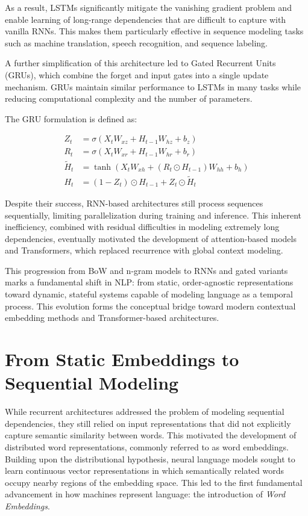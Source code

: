 As a result, LSTMs significantly mitigate the vanishing gradient problem and enable learning of long-range dependencies that are difficult to capture with vanilla RNNs. This makes them particularly effective in sequence modeling tasks such as machine translation, speech recognition, and sequence labeling.

A further simplification of this architecture led to Gated Recurrent Units (GRUs), which combine the forget and input gates into a single update mechanism. GRUs maintain similar performance to LSTMs in many tasks while reducing computational complexity and the number of parameters.

The GRU formulation is defined as:

\begin{align*}
Z_t &= \sigma(X_t W_{xz} + H_{t-1} W_{hz} + b_z) \\
R_t &= \sigma(X_t W_{xr} + H_{t-1} W_{hr} + b_r) \\
\tilde{H}_t &= \tanh(X_t W_{xh} + (R_t \odot H_{t-1}) W_{hh} + b_h) \\
H_t &= (1 - Z_t) \odot H_{t-1} + Z_t \odot \tilde{H}_t
\end{align*}


Despite their success, RNN-based architectures still process sequences sequentially, limiting parallelization during training and inference. This inherent inefficiency, combined with residual difficulties in modeling extremely long dependencies, eventually motivated the development of attention-based models and Transformers, which replaced recurrence with global context modeling.

This progression from BoW and n-gram models to RNNs and gated variants marks a fundamental shift in NLP: from static, order-agnostic representations toward dynamic, stateful systems capable of modeling language as a temporal process. This evolution forms the conceptual bridge toward modern contextual embedding methods and Transformer-based architectures.


\section{From Static Embeddings to Sequential Modeling}


While recurrent architectures addressed the problem of modeling sequential dependencies, they still relied on input representations that did not explicitly capture semantic similarity between words. This motivated the development of distributed word representations, commonly referred to as word embeddings.
Building upon the distributional hypothesis, neural language models sought to learn continuous vector representations in which semantically related words occupy nearby regions of the embedding space.
This led to the first fundamental advancement in how machines represent language: the introduction of \textit{Word Embeddings}. 

